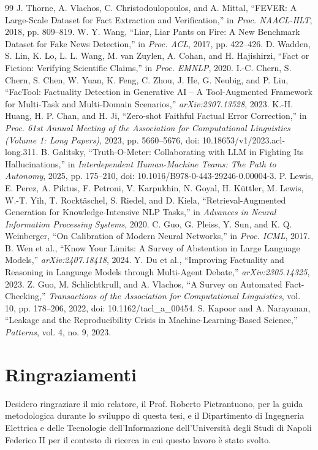 \documentclass[12pt,a4paper,openany]{report}
\begin{document}
\begin{thebibliography}{99}
 J. Thorne, A. Vlachos, C. Christodoulopoulos, and A. Mittal, ``FEVER: A Large-Scale Dataset for Fact Extraction and Verification,'' in \emph{Proc. NAACL-HLT}, 2018, pp. 809--819.
 W. Y. Wang, ``Liar, Liar Pants on Fire: A New Benchmark Dataset for Fake News Detection,'' in \emph{Proc. ACL}, 2017, pp. 422--426.
 D. Wadden, S. Lin, K. Lo, L. L. Wang, M. van Zuylen, A. Cohan, and H. Hajishirzi, ``Fact or Fiction: Verifying Scientific Claims,'' in \emph{Proc. EMNLP}, 2020.
 I.-C. Chern, S. Chern, S. Chen, W. Yuan, K. Feng, C. Zhou, J. He, G. Neubig, and P. Liu, ``FacTool: Factuality Detection in Generative AI -- A Tool-Augmented Framework for Multi-Task and Multi-Domain Scenarios,'' \emph{arXiv:2307.13528}, 2023.
 K.-H. Huang, H. P. Chan, and H. Ji, ``Zero-shot Faithful Factual Error Correction,'' in \emph{Proc. 61st Annual Meeting of the Association for Computational Linguistics (Volume 1: Long Papers)}, 2023, pp. 5660--5676, doi: 10.18653/v1/2023.acl-long.311.
 B. Galitsky, ``Truth-O-Meter: Collaborating with LLM in Fighting Its Hallucinations,'' in \emph{Interdependent Human-Machine Teams: The Path to Autonomy}, 2025, pp. 175--210, doi: 10.1016/B978-0-443-29246-0.00004-3.
 P. Lewis, E. Perez, A. Piktus, F. Petroni, V. Karpukhin, N. Goyal, H. Küttler, M. Lewis, W.-T. Yih, T. Rocktäschel, S. Riedel, and D. Kiela, ``Retrieval-Augmented Generation for Knowledge-Intensive NLP Tasks,'' in \emph{Advances in Neural Information Processing Systems}, 2020.
 C. Guo, G. Pleiss, Y. Sun, and K. Q. Weinberger, ``On Calibration of Modern Neural Networks,'' in \emph{Proc. ICML}, 2017.
 B. Wen et al., ``Know Your Limits: A Survey of Abstention in Large Language Models,'' \emph{arXiv:2407.18418}, 2024.
 Y. Du et al., ``Improving Factuality and Reasoning in Language Models through Multi-Agent Debate,'' \emph{arXiv:2305.14325}, 2023.
 Z. Guo, M. Schlichtkrull, and A. Vlachos, ``A Survey on Automated Fact-Checking,'' \emph{Transactions of the Association for Computational Linguistics}, vol. 10, pp. 178--206, 2022, doi: 10.1162/tacl\_a\_00454.
 S. Kapoor and A. Narayanan, ``Leakage and the Reproducibility Crisis in Machine-Learning-Based Science,'' \emph{Patterns}, vol. 4, no. 9, 2023.
\end{thebibliography}

\chapter*{Ringraziamenti}
Desidero ringraziare il mio relatore, il Prof. Roberto Pietrantuono, per la guida metodologica durante lo sviluppo di questa tesi, e il Dipartimento di Ingegneria Elettrica e delle Tecnologie dell'Informazione dell'Universit\`a degli Studi di Napoli Federico II per il contesto di ricerca in cui questo lavoro \`e stato svolto.
\end{document}
